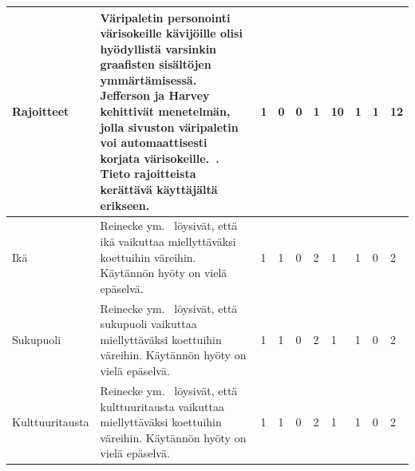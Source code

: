 \documentclass[finnish, 12pt, a4paper, elec, utf8, a-1b]{aaltothesis}
\begin{document}
{\begin{longtable}{p{2.5cm}|p{6cm}|p{0.5cm}p{0.5cm}p{0.5cm}|p{0.5cm}|p{0.5cm}p{0.5cm}p{0.5cm}|p{0.5cm}|}
    \midrule
    Rajoitteet                             & Väripaletin personointi värisokeille kävijöille olisi hyödyllistä varsinkin graafisten sisältöjen ymmärtämisessä. Jefferson ja Harvey kehittivät menetelmän, jolla sivuston väripaletin voi automaattisesti korjata värisokeille.~\cite{10.1145/1168987.1168996}. Tieto rajoitteista kerättävä käyttäjältä erikseen. & 1                                          & 0                                   & 0                                      & 1                            & 10                                              & 1                                         & 1                                         & 12                           \\
    \midrule
    Ikä                                    & Reinecke ym.~\cite{10.1145/2556288.2557052} löysivät, että ikä vaikuttaa miellyttäväksi koettuihin väreihin. Käytännön hyöty on vielä epäselvä.                                                                                                                                                                      & 1                                          & 1                                   & 0                                      & 2                            & 1                                               & 1                                         & 0                                         & 2                            \\
    \midrule
    Sukupuoli                              & Reinecke ym.~\cite{10.1145/2556288.2557052} löysivät, että sukupuoli vaikuttaa miellyttäväksi koettuihin väreihin. Käytännön hyöty on vielä epäselvä.                                                                                                                                                                & 1                                          & 1                                   & 0                                      & 2                            & 1                                               & 1                                         & 0                                         & 2                            \\
    \midrule
    Kulttuuritausta                        & Reinecke ym.~\cite{10.1145/2556288.2557052} löysivät, että kulttuuritausta vaikuttaa miellyttäväksi koettuihin väreihin. Käytännön hyöty on vielä epäselvä.                                                                                                                                                          & 1                                          & 1                                   & 0                                      & 2                            & 1                                               & 1                                         & 0                                         & 2                            \\

\end{longtable}}
\end{document}
